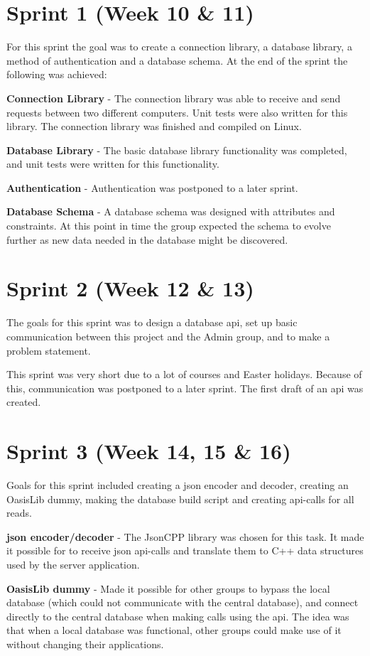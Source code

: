 \section{Sprint 1 (Week 10 \& 11)}
For this sprint the goal was to create a connection library, a database library, a method of authentication and a database schema. At the end of the sprint the following was achieved:

\textbf{Connection Library} - The connection library was able to receive and send requests between two different computers. Unit tests were also written for this library. The connection library was finished and compiled on Linux.

\textbf{Database Library} - The basic database library functionality was completed, and unit tests were written for this functionality.

\textbf{Authentication} - Authentication was postponed to a later sprint. 

\textbf{Database Schema} - A database schema was designed with attributes and constraints. At this point in time the group expected the schema to evolve further as new data needed in the database might be discovered.

\section{Sprint 2 (Week 12 \& 13)}
The goals for this sprint was to design a database \ac{api}, set up basic communication between this project and the Admin group, and to make a problem statement.

This sprint was very short due to a lot of courses and Easter holidays. Because of this, communication was postponed to a later sprint. The first draft of an \ac{api} was created.

\section{Sprint 3 (Week 14, 15 \& 16)}
Goals for this sprint included creating a \ac{json} encoder and decoder, creating an OasisLib dummy, making the database build script and creating \ac{api}-calls for all reads.

\textbf{\ac{json} encoder/decoder} - The JsonCPP library was chosen for this task. It made it possible for to receive \ac{json} \ac{api}-calls and translate them to C++ data structures used by the server application.

\textbf{OasisLib dummy} - Made it possible for other groups to bypass the local database (which could not communicate with the central database), and connect directly to the central database when making calls using the \ac{api}. The idea was that when a local database was functional, other groups could make use of it without changing their applications.

